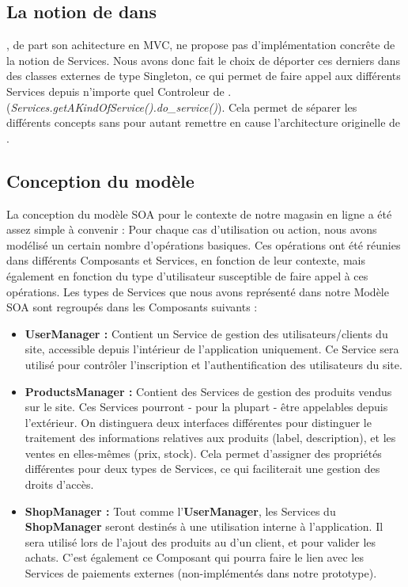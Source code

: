 \subsection{La notion de \kwsoa{} dans \kwplay{}}

\kwplay{}, de part son achitecture en MVC, ne propose pas d'implémentation concrête de la notion de Services. 
Nous avons donc fait le choix de déporter ces derniers dans des classes externes de type Singleton, ce qui permet de faire appel aux différents Services depuis n'importe quel Controleur de \kwplay{}. (\textit{Services.getAKindOfService().do\_service()}). 
Cela permet de séparer les différents concepts sans pour autant remettre en cause l'architecture originelle de \kwplay{}.

\subsection{Conception du modèle}

La conception du modèle SOA pour le contexte de notre magasin en ligne a été assez simple à convenir : Pour chaque cas d'utilisation ou action, nous avons modélisé un certain nombre d'opérations basiques. Ces opérations ont été réunies dans différents Composants et Services, en fonction de leur contexte, mais également en fonction du type d'utilisateur susceptible de faire appel à ces opérations.
Les types de Services que nous avons représenté dans notre Modèle SOA sont regroupés dans les Composants suivants :
\begin{itemize}
\item \textbf{UserManager :} Contient un Service de gestion des utilisateurs/clients du site, accessible depuis l'intérieur de l'application uniquement. Ce Service sera utilisé pour contrôler l'inscription et l'authentification des utilisateurs du site.
\item \textbf{ProductsManager :} Contient des Services de gestion des produits vendus sur le site. Ces Services pourront - pour la plupart - être appelables depuis l'extérieur. On distinguera deux interfaces différentes pour distinguer le traitement des informations relatives aux produits (label, description), et les ventes en elles-mêmes (prix, stock). Cela permet d'assigner des propriétés différentes pour deux types de Services, ce qui faciliterait une gestion des droits d'accès.
\item \textbf{ShopManager :} Tout comme l'\textbf{UserManager}, les Services du \textbf{ShopManager} seront destinés à une utilisation interne à l'application. Il sera utilisé lors de l'ajout des produits au  d'un client, et pour valider les achats. C'est également ce Composant qui pourra faire le lien avec les Services de paiements externes (non-implémentés dans notre prototype).
\end{itemize}

